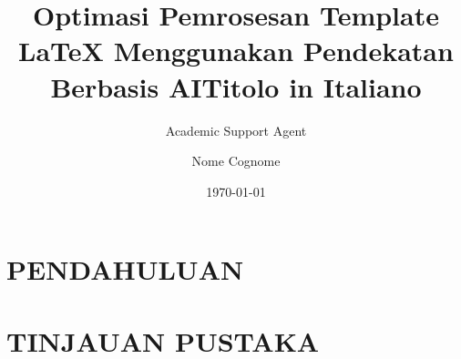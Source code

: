 \documentclass{theme/uniprthesis}
\title{Optimasi Pemrosesan Template LaTeX Menggunakan Pendekatan Berbasis AI}
\author{Academic Support Agent}
\date{\today}
\begin{document}
\maketitle

\begin{abstract}

\end{abstract}

\chapter{PENDAHULUAN}


\chapter{TINJAUAN PUSTAKA}



\usepackage[italian]{babel}		%
\usepackage{todonotes}			%


\usepackage{blindtext} 			%



\title{Titolo in Italiano}
\author{Nome Cognome}


\newcommand{\subTitle}{Titolo in Inglese} %


\newcommand{\coadvisor}{Prof. co-Nome co-Cognome} %
\newcommand{\coadvisorSecond}{Prof. co-Nome2 co-Cognome2} %
\end{document}

